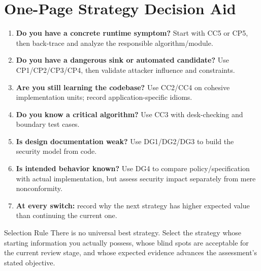\documentclass[10pt]{article}
\begin{document}
\section{One-Page Strategy Decision Aid}
\begin{enumerate}
\item \textbf{Do you have a concrete runtime symptom?} Start with CC5 or CP5, then back-trace and analyze the responsible algorithm/module.
\item \textbf{Do you have a dangerous sink or automated candidate?} Use CP1/CP2/CP3/CP4, then validate attacker influence and constraints.
\item \textbf{Are you still learning the codebase?} Use CC2/CC4 on cohesive implementation units; record application-specific idioms.
\item \textbf{Do you know a critical algorithm?} Use CC3 with desk-checking and boundary test cases.
\item \textbf{Is design documentation weak?} Use DG1/DG2/DG3 to build the security model from code.
\item \textbf{Is intended behavior known?} Use DG4 to compare policy/specification with actual implementation, but assess security impact separately from mere nonconformity.
\item \textbf{At every switch:} record why the next strategy has higher expected value than continuing the current one.
\end{enumerate}

\begin{keybox}{Selection Rule}
There is no universal best strategy. Select the strategy whose starting information you actually possess, whose blind spots are acceptable for the current review stage, and whose expected evidence advances the assessment's stated objective.
\end{keybox}
\end{document}
